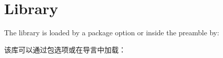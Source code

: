 \setcounter{section}{15}
\section{Library }\label{sec:raster}%
%
The library is loaded by a package option or inside the preamble by:

该库可以通过包选项或在导言中加载：
\begin{dispListing}
\end{dispListing}









